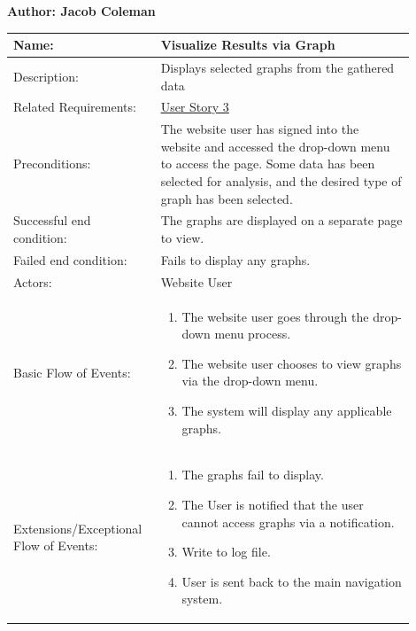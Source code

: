 \documentclass[11pt]{article}
\begin{document}
\begin{table}[!ht]
\begin{center}
\textbf{Author: Jacob Coleman}
\vspace*{1em}

\begin{tabular}{p{0.30\linewidth}p{0.60\linewidth}}
	Name: & Visualize Results via Graph\\\hline
	Description: & Displays selected graphs from the gathered data\\\hline
	Related Requirements:& \hyperlink{us3}{User Story 3}\\\hline
	Preconditions:& The website user has signed into the website and accessed the drop-down menu to access the page. Some data has been selected for analysis, and the desired type of graph has been selected.\\\hline
	Successful end condition:& The graphs are displayed on a separate page to view.\\\hline
	Failed end condition:& Fails to display any graphs.\\\hline
	Actors:& Website User\\\hline
	Basic Flow of Events: & \begin{enumerate}
	\item The website user goes through the drop-down menu process.
	\item The website user chooses to view graphs via the drop-down menu.
	\item The system will display any applicable graphs.
	\end{enumerate}\\\hline
	Extensions/Exceptional Flow of Events: & \begin{enumerate}
	\item The graphs fail to display.
	\item The User is notified that the user cannot access graphs via a notification.
	\item Write to log file.
	\item User is sent back to the main navigation system.
	\end{enumerate}
\end{tabular}
\label{des:vis_res}	
\end{center}
\end{table}
\end{document}
